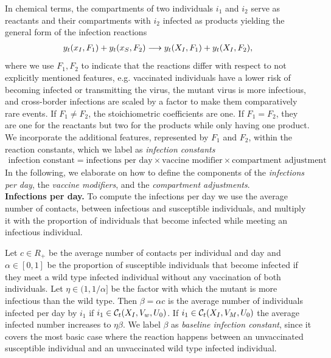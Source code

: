 In chemical terms, the compartments of two individuals $i_1$ and $i_2$ serve as reactants and their compartments with $i_2$ infected as products yielding the general form of the infection reactions
\begin{align}
\label{eq:general_infection}
y_t(x_I, F_1) + y_t(x_S, F_2) \longrightarrow y_t(X_I, F_1) + y_t(X_I, F_2),
\end{align}
where we use $F_1, F_2$ to indicate that the reactions differ with respect to not explicitly mentioned features, e.g. vaccinated individuals have a lower risk of becoming infected or transmitting the virus, the mutant virus is more infectious, and cross-border infections are scaled by a factor to make them comparatively rare events. If $F_1 \neq F_2$, the stoichiometric coefficients are one. If $F_1=F_2$, they are one for the reactants but two for the products while only having one product. We incorporate the additional features, represented by $F_1$ and $F_2$, within the reaction constants, which we label as \textit{infection constants}
\begin{align*}
\text{infection constant} = \text{infections per day} \times \text{vaccine modifier} \times \text{compartment adjustment}
\end{align*}
In the following, we elaborate on how to define the components of the \textit{infections per day}, the \textit{vaccine modifiers}, and the \textit{compartment adjustments}.\\

\textbf{Infections per day.} To compute the infections per day we use the average number of contacts, between infectious and susceptible individuals, and multiply it with the proportion of individuals that become infected while meeting an infectious individual.

Let $c \in R_+$ be the average number of contacts per individual and day and $\alpha \in [0,1]$ be the proportion of susceptible individuals that become infected if they meet a wild type infected individual without any vaccination of both individuals. Let $\eta \in (1, 1/\alpha]$ be the factor with which the mutant is more infectious than the wild type. Then $\beta = \alpha c$ is the average number of individuals infected per day by $i_1$ if $i_1 \in \mathcal{C}_t(X_I, V_w, U_0)$. If $i_1 \in \mathcal{C}_t(X_I, V_M, U_0)$ the average infected number increases to $\eta \beta$. We label $\beta$ as \textit{baseline infection constant}, since it covers the most basic case where the reaction happens between an unvaccinated susceptible individual and an unvaccinated wild type infected individual. \\

